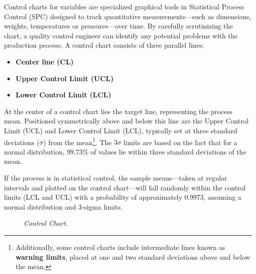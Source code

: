 \documentclass[twoside]{book}
\begin{document}
Control charts for variables are specialized graphical tools in Statistical Process Control (SPC) designed to track quantitative measurements—such as dimensions, weights, temperatures or pressures—over time. By carefully scrutinizing the chart, a
quality control engineer can identify any potential problems with the production process. A control chart consists of three parallel lines:

\begin{itemize}
    \item \textbf{Center line (CL)}
    \item \textbf{Upper Control Limit (UCL)}
    \item \textbf{Lower Control Limit (LCL)}
\end{itemize}
At the center of a control chart lies the target line, representing the process mean. Positioned symmetrically above and below this line are the Upper Control Limit (UCL) and Lower Control Limit (LCL), typically set at three standard deviations ($\sigma$) from the mean\footnote{Additionally, some control charts include intermediate lines known as \textbf{warning limits}, placed at one and two standard deviations above and below the mean.}. The $3\sigma$ limits are based on the fact that for a normal distribution, 99.73\% of values lie within three standard deviations of the mean.

If the process is in statistical control, the sample means—taken at regular intervals and plotted on the control chart—will fall randomly within the control limits (LCL and UCL) with a probability of approximately 0.9973, assuming a normal distribution and 3-sigma limits.

\begin{figure}[H]
\centering
{}
\caption{\textit{Control Chart.}}
\end{figure}
\end{document}
